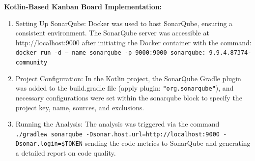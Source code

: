 \textbf{Kotlin-Based Kanban Board Implementation:}
\begin{enumerate}
    \item Setting Up SonarQube: Docker was used to host SonarQube, ensuring a consistent environment. The SonarQube server was accessible at http://localhost:9000 after initiating the Docker container with the command: \texttt{docker run -d — name sonarqube -p 9000:9000 sonarqube: 9.9.4.87374-community}
    \item Project Configuration: In the Kotlin project, the SonarQube Gradle plugin was added to the build.gradle file (apply plugin: \verb|"org.sonarqube"|), and necessary configurations were set within the sonarqube block to specify the project key, name, sources, and exclusions.
    \item Running the Analysis: The analysis was triggered via the command \texttt{./gradlew sonarqube -Dsonar.host.url=http://localhost:9000 \newline-Dsonar.login=\$TOKEN} sending the code metrics to SonarQube and generating a detailed report on code quality.
\end{enumerate}

